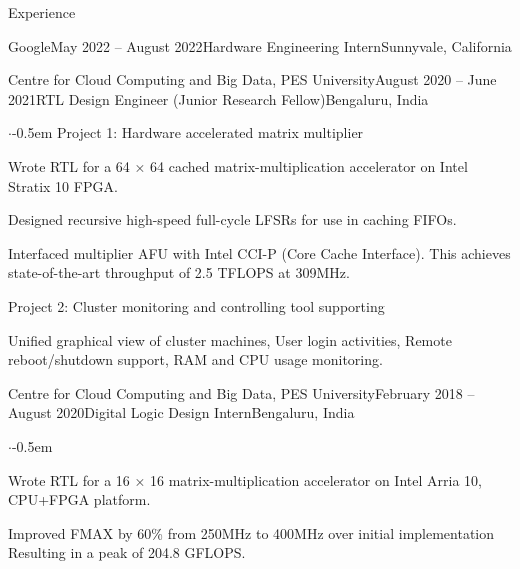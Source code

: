\documentclass{CV} %
\begin{document}




\begin{rSection}{Experience}

  \begin{rSubsection}{Google}{May 2022 -- August 2022}{Hardware Engineering Intern}{Sunnyvale, California}
  \end{rSubsection}

  
  \begin{rSubsection}{Centre for Cloud Computing and Big Data, PES University}{August 2020 -- June 2021}{RTL Design Engineer (Junior Research Fellow)}{Bengaluru, India}
    \begin{list}{$\cdot$}{\footnotesize}\itemsep -0.5em \vspace{-0.5em}
      Project 1: Hardware accelerated matrix multiplier
    \item Wrote RTL for a 64 × 64 cached matrix-multiplication accelerator on Intel Stratix 10 FPGA.
    \item Designed recursive high-speed full-cycle LFSRs for use in caching FIFOs.
    \item  Interfaced multiplier AFU with Intel CCI-P (Core Cache Interface).
      This achieves state-of-the-art throughput of 2.5 TFLOPS at 309MHz.


      Project 2: Cluster monitoring and controlling tool supporting
      \item Unified graphical view of cluster machines, User login activities, Remote reboot/shutdown support, RAM and CPU usage monitoring.
    \end{list}
  \end{rSubsection}

  \begin{rSubsection}{Centre for Cloud Computing and Big Data, PES University}{February 2018 -- August 2020}{Digital Logic Design Intern}{Bengaluru, India}
    \begin{list}{$\cdot$}{\footnotesize}\itemsep -0.5em \vspace{-0.5em}
    \item Wrote RTL for a 16 × 16 matrix-multiplication accelerator on Intel Arria 10, CPU+FPGA platform.
    \item Improved FMAX by 60\% from 250MHz to 400MHz over initial implementation Resulting in a peak of 204.8 GFLOPS.


\end{list}
\end{rSubsection}
\end{rSection}
\end{document}
